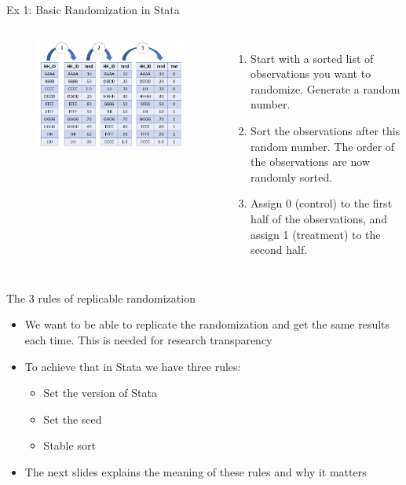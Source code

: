 \documentclass[aspectratio=169]{beamer}
\begin{document}
\begin{frame}[fragile]{Ex 1: Basic Randomization in Stata}
	\begin{columns}[c]
		\begin{figure}
			\centering
			\includegraphics[width=\linewidth]{img/randomeg1}
		\end{figure}
		
		\begin{enumerate}
			\item \small Start with a sorted list of observations you want to randomize. Generate a random number.
			\item \small Sort the observations after this random number. The order of the observations are now randomly sorted.
			\item \small Assign 0 (control) to the first half of the observations, and assign 1 (treatment) to the second half.		
		\end{enumerate}
	\end{columns}
\end{frame}


\begin{frame}{The 3 rules of replicable randomization}
	\begin{itemize}
		\item We want to be able to replicate the randomization and get the same results each time. This is needed for research transparency
		\item To achieve that in Stata we have three rules:
		\begin{itemize}
			\item Set the version of Stata
			\item Set the seed 
			\item Stable sort
		\end{itemize}
		\item The next slides explains the meaning of these rules and why it matters
	\end{itemize}
\end{frame}
\end{document}
